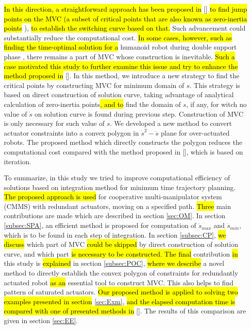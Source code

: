 \documentclass{rob}%
\begin{document}
\hl{In this direction, a straightforward approach has been proposed in} [] \hl{to find  jump points on the MVC (a subset of critical points that are also known as zero-inertia points} \cite{Shiller1992, Pfeiffer1987, Pham2014}), \hl{to establish the switching curve based on that.} Such advancement could substantially reduce the computational cost. \hl{In some cases, however, such as finding the time-optimal solution for a} humanoid robot during double support phase \cite{Sadigh2013}, there remains a part of MVC whose construction is inevitable. \hl{Such a case motivated this study to further examine this issue and try to enhance the method proposed in} []. 
In this method, we introduce a new strategy to find the critical points by constructing MVC for minimum domain of $ s $. This strategy is based on direct construction of solution curve, taking advantage of analytical calculation of zero-inertia points\hl{, and to} find the domain of $ s $, if any, for witch no value of $ \dot s $ on solution curve is found during previous step. Construction of MVC is only necessary for such value of $ s $. 
We developed a new method to convert actuator constraints into a convex polygon in $ {\dot s}^2-\ddot s $ plane for over-actuated robots. 
The proposed method which directly constructs the polygon reduces the computational cost compared with the method proposed in [], which is based on iteration.
	
To summarize, in this study we tried to improve computational efficiency of solutions based on integration method for minimum time trajectory planning. \hl{The proposed approach is used} for cooperative multi-manipulator system (CMMS) with redundant actuators, moving on a specified path. \hl{Three} main contributions are made which are described in section \ref{sec:OM}. 
In section \ref{subsec:SPA}, an efficient method is proposed for computation of $ \ddot{s}_{max} $ and $ \ddot{s}_{min} $, which is to be found in each step of integration. 
In section  \ref{subsec:CP}, \hl{we discuss} which part of MVC \hl{could be skipped} by direct construction of solution curve, and which part \hl{is necessary to be constructed. The final} contribution \hl{in} this study is \hl{explained} in section \ref{subsec:POC}, \hl{where we describe} a novel method to directly establish the convex polygon of constraints for redundantly actuated robot \hl{as an} essential tool to construct MVC. This also helps to find pattern of saturated actuators.
\hl{Our proposed method is applied to solving two examples presented in section} \ref{sec:Exm}, \hl{and the elapsed computation time is compared with one of presented methods in} []. The results of this comparison are given in section \ref{sec:EE}.
\end{document}
